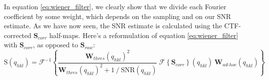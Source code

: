 In equation \ref{eq:wiener_filter}, we clearly show that we divide each Fourier coefficient by some weight, which depends on the sampling and on our SNR estimate. As we have now seen, the SNR estimate is calculated using the CTF-corrected $\bm{S}_{corr}$ half-maps. Here's a reformulation of equation \ref{eq:wiener_filter} with $\bm{S}_{corr}$, as opposed to $\bm{S}_{raw}$:
\begin{equation} \label{eq:wiener_filter2}
    \bm{\mathrm{S}}({q}_{hkl}) = 
        \mathcal{F}^{-1} \left\{ 
            \dfrac{ { \bm{W}_{thres}({q}_{hkl}) }^2 }{ { \bm{W}_{thres}({q}_{hkl}) }^2 + {1}\ /\ {\bm{\mathrm{SNR}}({q}_{hkl})} }\ \mathcal{F} \left\{ \bm{S}_{corr} \right\}\!({q}_{hkl})\ \bm{W}_{ad\text{-}hoc}({q}_{hkl})
        \right\}
\end{equation}










